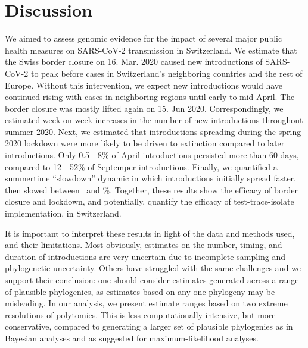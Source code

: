 \documentclass[11pt,twoside,lineno]{pnas-new} %
\begin{document}
\section{Discussion}
We aimed to assess genomic evidence for the impact of several major public health measures on SARS-CoV-2 transmission in Switzerland. We estimate that the Swiss border closure on 16. Mar. 2020 caused new introductions of SARS-CoV-2 to peak before cases in Switzerland's neighboring countries and the rest of Europe. Without this intervention, we  expect new introductions would have continued rising with cases in neighboring regions until early to mid-April. The border closure was mostly lifted again on 15. Jun 2020. Correspondingly, we estimated week-on-week increases in the number of new introductions throughout summer 2020. Next, we estimated that introductions spreading during the spring 2020 lockdown were more likely to be driven to extinction compared to later introductions. Only 0.5 - 8\% of April introductions persisted more than 60 days, compared to 12 - 52\% of Septemper introductions. Finally, we quantified a summertime ``slowdown'' dynamic in which introductions initially spread faster, then slowed between \summermaxdampingpercentmedianCHEnosampUB\ and \summermindampingpercentmedianCHEnosampUB \%. Together, these results show the efficacy of border closure and lockdown, and potentially, quantify the efficacy of test-trace-isolate implementation, in Switzerland.

It is important to interpret these results in light of the data and methods used, and their limitations. Most obviously, estimates on the number, timing, and duration of introductions are very uncertain due to incomplete sampling and phylogenetic uncertainty. Others have struggled with the same challenges \cite{Morel2021} and we support their conclusion: one should consider estimates generated across a range of plausible phylogenies, as estimates based on any one phylogeny may be misleading. In our analysis, we present estimate ranges based on two extreme resolutions of polytomies. This is less computationally intensive, but more conservative, compared to generating a larger set of plausible phylogenies as in Bayesian analyses and as \cite{Morel2021} suggested for maximum-likelihood analyses.
\end{document}
